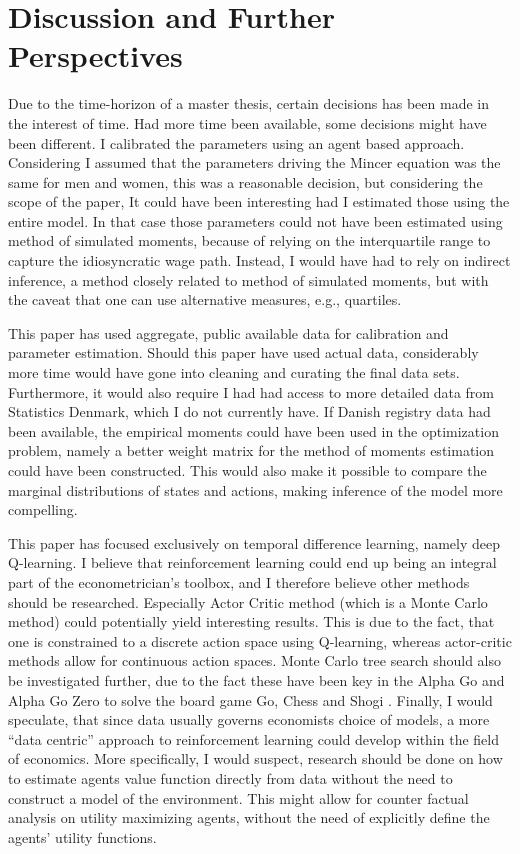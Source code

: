 \section{Discussion and Further Perspectives}

Due to the time-horizon of a master thesis, certain decisions has been made in the interest of time. Had more time been available, some decisions might have been different. I calibrated the parameters using an agent based approach. Considering I assumed that the parameters driving the Mincer equation was the same for men and women, this was a reasonable decision, but considering the scope of the paper, It could have been interesting had I estimated those using the entire model. In that case those parameters could not have been estimated using method of simulated moments, because of relying on the interquartile range to capture the idiosyncratic wage path. Instead, I would have had to rely on indirect inference, a method closely related to method of simulated moments, but with the caveat that one can use alternative measures, e.g., quartiles.

This paper has used aggregate, public available data for calibration and parameter estimation. Should this paper have used actual data, considerably more time would have gone into cleaning and curating the final data sets. Furthermore, it would also require I had had access to more detailed data from Statistics Denmark, which I do not currently have. If Danish registry data had been available, the empirical moments could have been used in the optimization problem, namely a better weight matrix for the method of moments estimation could have been constructed. This would also make it possible to compare the marginal distributions of states and actions, making inference of the model more compelling.

This paper has focused exclusively on temporal difference learning, namely deep Q-learning. I believe that reinforcement learning could end up being an integral part of the econometrician's toolbox, and I therefore believe other methods should be researched. Especially Actor Critic method (which is a Monte Carlo method) could potentially yield interesting results. This is due to the fact, that one is constrained to a discrete action space using Q-learning, whereas actor-critic methods allow for continuous action spaces. Monte Carlo tree search should also be investigated further, due to the fact these have been key in the Alpha Go and Alpha Go Zero to solve the board game Go, Chess and Shogi \parencite{silver_general_2018}. Finally, I would speculate, that since data usually governs economists choice of models, a more ``data centric'' approach to reinforcement learning could develop within the field of economics. More specifically, I would suspect, research should be done on how to estimate agents value function directly from data without the need to construct a model of the environment. This might allow for counter factual analysis on utility maximizing agents, without the need of explicitly define the agents' utility functions.

